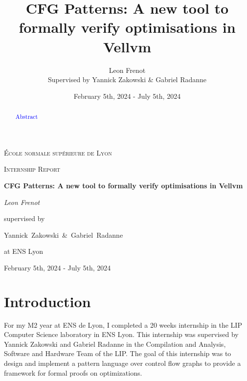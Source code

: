 \documentclass[11pt]{article}
\newcommand{\leon}[1]{\textcolor{blue}{#1}}
\begin{document}
\title{CFG Patterns: A new tool to formally verify optimisations in Vellvm}

\author{Leon Frenot\\ Supervised by Yannick Zakowski \& Gabriel Radanne}

\date{February 5th, 2024 - July 5th, 2024}

\begin{titlepage}
  \centering
  {\textsc{École normale supérieure de Lyon} \par}
  \vspace{1cm}
  {\Large \textsc{Internship Report}\par}
  \vspace{1.5cm}
  {\huge\bfseries CFG Patterns: A new tool to formally verify optimisations in Vellvm\par}
  \vspace{2cm}
  {\Large\itshape Leon Frenot\par}
  \vfill
  supervised by\par
  Yannick~Zakowski~\&~Gabriel~Radanne\par
  at ENS Lyon
  \vfill

  {\large February 5th, 2024 - July 5th, 2024\par}
\end{titlepage}

\tableofcontents
\newpage

\hypersetup{colorlinks=true, linkcolor=red}

\begin{abstract}
  \leon{Abstract}
\end{abstract}

\section{Introduction}
\label{sec:intro}

\indent
For my M2 year at ENS de Lyon, I completed a 20 weeks internship in the LIP Computer Science laboratory in ENS Lyon. This internship was supervised by Yannick Zakowski and Gabriel Radanne in the Compilation and Analysis, Software and Hardware Team of the LIP. The goal of this internship was to design and implement a pattern language over control flow graphs to provide a framework for formal proofs on optimizations.



\end{document}

